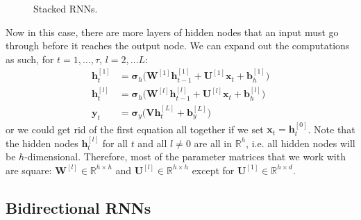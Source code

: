 \documentclass{article}
\begin{document}
\begin{figure}[H]
      \caption{Stacked RNNs.} 
      \label{fig:stacked_rnn}
    \end{figure}

    Now in this case, there are more layers of hidden nodes that an input must go through before it reaches the output node. We can expand out the computations as such, for $t = 1, \ldots, \tau$, $l = 2, \ldots L$: 
    \begin{align}
      \mathbf{h}_t^{[1]} & = \boldsymbol{\sigma}_h \big( \mathbf{W}^{[1]} \mathbf{h}_{t-1}^{[1]} + \mathbf{U}^{[1]} \mathbf{x}_t + \mathbf{b}_h^{[1]} \big) \\
      \mathbf{h}_t^{[l]} & = \boldsymbol{\sigma}_h \big( \mathbf{W}^{[l]} \mathbf{h}_{t-1}^{[l]} + \mathbf{U}^{[l]} \mathbf{x}_t + \mathbf{b}_h^{[l]} \big) \\
      \mathbf{y}_t & = \boldsymbol{\sigma}_y \big( \mathbf{V} \mathbf{h}_t^{[L]} + \mathbf{b}_y^{[L]} \big) 
    \end{align}
    or we could get rid of the first equation all together if we set $\mathbf{x}_t = \mathbf{h}_t^{[0]}$. Note that the hidden nodes $\mathbf{h}^{[l]}_t$ for all $t$ and all $l \neq 0$ are all in $\mathbb{R}^h$, i.e. all hidden nodes will be $h$-dimensional. Therefore, most of the parameter matrices that we work with are square: $\mathbf{W}^{[l]} \in \mathbb{R}^{h \times h}$ and $\mathbf{U}^{[l]} \in \mathbb{R}^{h \times h}$ except for $\mathbf{U}^{[1]} \in \mathbb{R}^{h \times d}$. 

\subsection{Bidirectional RNNs}
\end{document}
